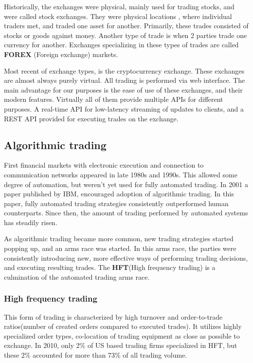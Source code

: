 Historically, the exchanges were physical, mainly used for trading stocks, and
were called stock exchanges. They were physical locations , where individual traders met, and traded one asset for another.
Primarily, these trades consisted of stocks or goods against money. Another type of trade is when 2 parties trade one currency for another.
Exchanges specializing in these types of trades are called \textbf{FOREX} (Foreign exchange) markets.

Most recent of exchange types, is the cryptocurrency exchange. These exchanges are almost always purely virtual. All trading is performed
via web interface. The main advantage for our purposes is the ease of use of these exchanges, and their modern features.
Virtually all of them provide multiple APIs for different purposes. A real-time API for low-latency streaming of updates to clients,
and a REST API provided for executing trades on the exchange.

\subsection{Algorithmic trading}
First financial markets with electronic execution and connection to communication networks appeared
in late 1980s and 1990s. This allowed some degree of automation, but weren't yet used for fully
automated trading. In 2001 a paper published by IBM\cite{Tesauro:2001:HBA:501158.501183},
encouraged adoption of algorithmic trading. In this paper, fully automated trading strategies
consistently outperformed human counterparts. Since then, the amount of trading performed by
automated systems has steadily risen.

As algorithmic trading became more common, new trading strategies started popping up, and
an arms race was started. In this arms race, the parties were consistently introducing new,
more effective ways of performing trading decisions, and executing resulting trades. The \textbf{HFT}(High frequency trading)
is a culmination of the automated trading arms race.

\subsubsection{High frequency trading}
This form of trading is characterized by high turnover and order-to-trade ratios(number of created orders compared to executed trades).
It utilizes highly specialized order types, co-location of trading equipment as close as possible to exchange.
In 2010, only 2\% of US based trading firms specialized in HFT, but these 2\% accounted for more than 73\% of all
trading volume\cite{article:computerized_trading}.

